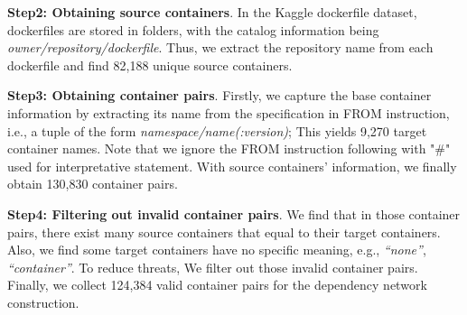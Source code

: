 \documentclass[sigconf]{acmart}
\begin{document}

\noindent\textbf{Step2: Obtaining source containers}. In the Kaggle dockerfile dataset, dockerfiles are stored in folders, with the catalog information being \emph{owner/repository/dockerfile}. 
Thus, we extract the repository name from each dockerfile and find 82,188 unique source containers. 


\noindent\textbf{Step3: Obtaining container pairs}.  
Firstly, we capture the base container information by extracting its name from the specification in FROM instruction, i.e., a tuple of the form \emph{namespace/name(:version)}; This yields 9,270 target container names. 
Note that we 
ignore the FROM instruction following with "\#" used for interpretative statement. With source containers' information, we finally obtain 130,830 container pairs.

\noindent\textbf{Step4: Filtering out invalid container pairs}. We find that in those container pairs, there exist many source containers that equal to their target containers. 
Also, we find some target containers have no specific meaning, e.g., \emph{``none''}, \emph{``container''}. 
To reduce threats, We filter out those invalid container pairs.
Finally, we collect 124,384 valid container pairs for the dependency network construction.
\end{document}
